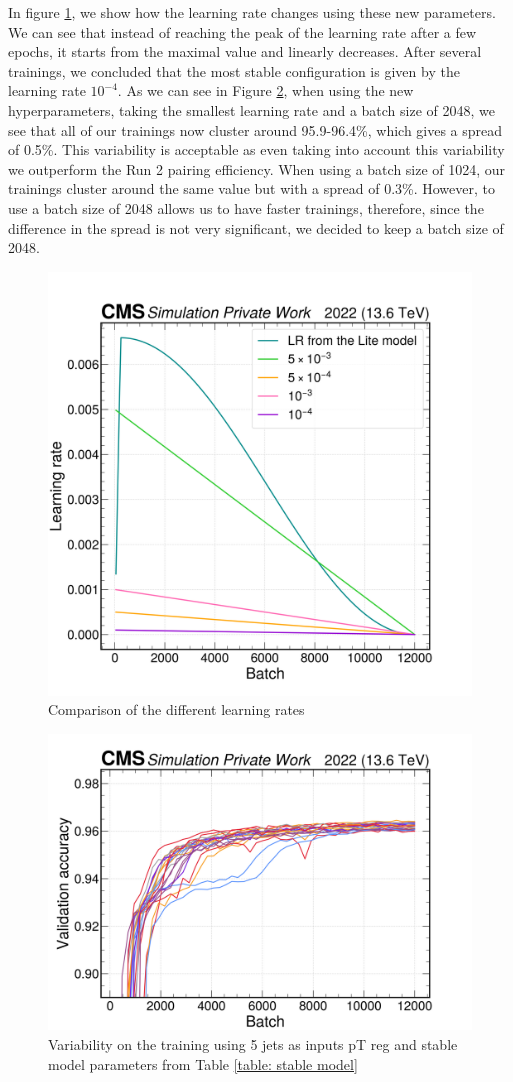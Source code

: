 In figure \ref{fig: lr comp}, we show how the learning rate changes using these new parameters. We can see that instead of reaching the peak of the learning rate after a few epochs, it starts from the maximal value and linearly decreases. After several trainings, we concluded that the most stable configuration is given by the learning rate $10^{-4}$. As we can see in Figure \ref{fig: stable test}, when using the new hyperparameters, taking the smallest learning rate and a batch size of 2048, we see that all of our trainings now cluster around 95.9-96.4\%, which gives a spread of 0.5\%. This variability is acceptable as even taking into account this variability we outperform the Run 2 pairing efficiency. When using a batch size of 1024, our trainings cluster around the same value but with a spread of 0.3\%. However, to use a batch size of 2048 allows us to have faster trainings, therefore, since the difference in the spread is not very significant, we decided to keep a batch size of 2048. 

\begin{figure}[hbt]
    \centering
    \includegraphics[width=0.6\linewidth]{Images/6.Improving/Variability Study/learning rate comp.png}
    \caption{Comparison of the different learning rates}
    \label{fig: lr comp}
\end{figure}

\begin{figure}[hbt]
    \centering
    \includegraphics[width=0.7\linewidth]{Images/6.Improving/Variability Study/var 2048.png}
    \caption{Variability on the training using 5 jets as inputs pT reg and stable model parameters from Table \ref{table: stable model}}
    \label{fig: stable test}
\end{figure}

